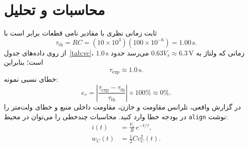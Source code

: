 \section{محاسبات و تحلیل}

ثابت زمانی نظری با مقادیر نامی قطعات برابر است با
\begin{equation}
  \tau_{\mathrm{th}}=RC=(10\times 10^3)(100\times 10^{-6})=1.00\,\mathrm{s}.
  \label{eq:tau-th}
\end{equation}
از روی داده‌های جدول~\ref{tab:vc}، زمانی که ولتاژ به $0.63V_s\approx 6.3\,\mathrm{V}$ می‌رسد حدود $1.0\,\mathrm{s}$ است؛ بنابراین
\begin{equation}
  \tau_{\mathrm{exp}}\approx 1.0\,\mathrm{s}.
\end{equation}
خطای نسبی نمونه:
\begin{equation}
  e_r=\left|\frac{\tau_{\mathrm{exp}}-\tau_{\mathrm{th}}}{\tau_{\mathrm{th}}}\right|\times 100\% \approx 0\%.
\end{equation}
در گزارش واقعی، تلرانس مقاومت و خازن، مقاومت داخلی منبع و خطای ولت‌متر را در بودجه خطا وارد کنید.
محاسبات چندخطی را می‌توان در محیط \texttt{align} نوشت:
\begin{align}
  i(t) &= \frac{V_s}{R}\,e^{-t/\tau}, \\
  w_C(t) &= \tfrac{1}{2}C v_C^2(t).
\end{align}

